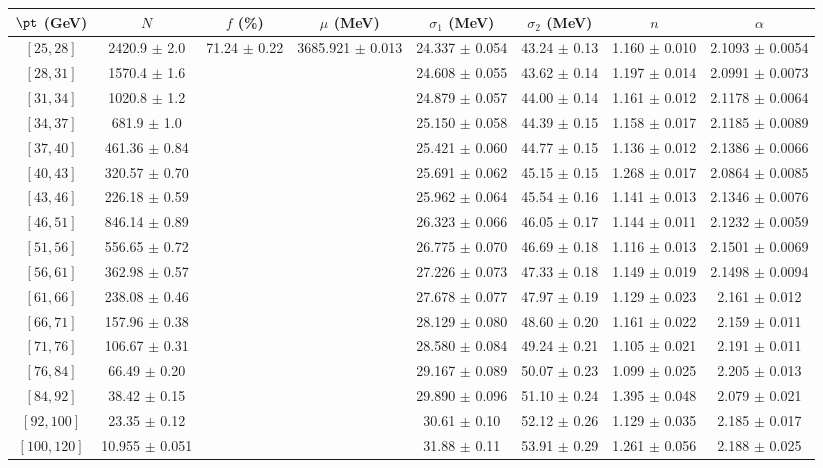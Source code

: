 \begin{tabular}{c||c|c|c|c|c|c|c}
$\pt$ (GeV) & $N$ & $f$ (\%) & $\mu$ (MeV) & $\sigma_1$ (MeV) & $\sigma_2$ (MeV) & $n$ & $\alpha$ \\
\hline
$[25, 28]$ & 2420.9 $\pm$ 2.0 & \multirow{17}{*}{71.24 $\pm$ 0.22} & \multirow{17}{*}{3685.921 $\pm$ 0.013} & 24.337 $\pm$ 0.054 & 43.24 $\pm$ 0.13 & 1.160 $\pm$ 0.010 & 2.1093 $\pm$ 0.0054\\
$[28, 31]$ & 1570.4 $\pm$ 1.6 &  &  & 24.608 $\pm$ 0.055 & 43.62 $\pm$ 0.14 & 1.197 $\pm$ 0.014 & 2.0991 $\pm$ 0.0073\\
$[31, 34]$ & 1020.8 $\pm$ 1.2 &  &  & 24.879 $\pm$ 0.057 & 44.00 $\pm$ 0.14 & 1.161 $\pm$ 0.012 & 2.1178 $\pm$ 0.0064\\
$[34, 37]$ & 681.9 $\pm$ 1.0 &  &  & 25.150 $\pm$ 0.058 & 44.39 $\pm$ 0.15 & 1.158 $\pm$ 0.017 & 2.1185 $\pm$ 0.0089\\
$[37, 40]$ & 461.36 $\pm$ 0.84 &  &  & 25.421 $\pm$ 0.060 & 44.77 $\pm$ 0.15 & 1.136 $\pm$ 0.012 & 2.1386 $\pm$ 0.0066\\
$[40, 43]$ & 320.57 $\pm$ 0.70 &  &  & 25.691 $\pm$ 0.062 & 45.15 $\pm$ 0.15 & 1.268 $\pm$ 0.017 & 2.0864 $\pm$ 0.0085\\
$[43, 46]$ & 226.18 $\pm$ 0.59 &  &  & 25.962 $\pm$ 0.064 & 45.54 $\pm$ 0.16 & 1.141 $\pm$ 0.013 & 2.1346 $\pm$ 0.0076\\
$[46, 51]$ & 846.14 $\pm$ 0.89 &  &  & 26.323 $\pm$ 0.066 & 46.05 $\pm$ 0.17 & 1.144 $\pm$ 0.011 & 2.1232 $\pm$ 0.0059\\
$[51, 56]$ & 556.65 $\pm$ 0.72 &  &  & 26.775 $\pm$ 0.070 & 46.69 $\pm$ 0.18 & 1.116 $\pm$ 0.013 & 2.1501 $\pm$ 0.0069\\
$[56, 61]$ & 362.98 $\pm$ 0.57 &  &  & 27.226 $\pm$ 0.073 & 47.33 $\pm$ 0.18 & 1.149 $\pm$ 0.019 & 2.1498 $\pm$ 0.0094\\
$[61, 66]$ & 238.08 $\pm$ 0.46 &  &  & 27.678 $\pm$ 0.077 & 47.97 $\pm$ 0.19 & 1.129 $\pm$ 0.023 & 2.161 $\pm$ 0.012\\
$[66, 71]$ & 157.96 $\pm$ 0.38 &  &  & 28.129 $\pm$ 0.080 & 48.60 $\pm$ 0.20 & 1.161 $\pm$ 0.022 & 2.159 $\pm$ 0.011\\
$[71, 76]$ & 106.67 $\pm$ 0.31 &  &  & 28.580 $\pm$ 0.084 & 49.24 $\pm$ 0.21 & 1.105 $\pm$ 0.021 & 2.191 $\pm$ 0.011\\
$[76, 84]$ & 66.49 $\pm$ 0.20 &  &  & 29.167 $\pm$ 0.089 & 50.07 $\pm$ 0.23 & 1.099 $\pm$ 0.025 & 2.205 $\pm$ 0.013\\
$[84, 92]$ & 38.42 $\pm$ 0.15 &  &  & 29.890 $\pm$ 0.096 & 51.10 $\pm$ 0.24 & 1.395 $\pm$ 0.048 & 2.079 $\pm$ 0.021\\
$[92, 100]$ & 23.35 $\pm$ 0.12 &  &  & 30.61 $\pm$ 0.10 & 52.12 $\pm$ 0.26 & 1.129 $\pm$ 0.035 & 2.185 $\pm$ 0.017\\
$[100, 120]$ & 10.955 $\pm$ 0.051 &  &  & 31.88 $\pm$ 0.11 & 53.91 $\pm$ 0.29 & 1.261 $\pm$ 0.056 & 2.188 $\pm$ 0.025\\
\end{tabular}
